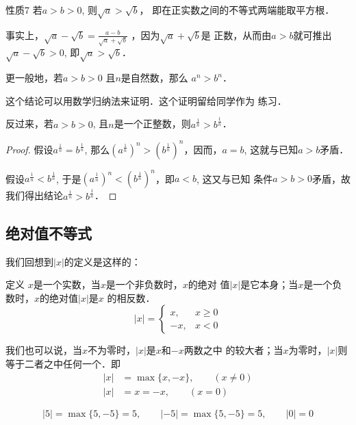 \begin{blk}{性质7}
    若$a>b>0$, 则$\sqrt{a}>\sqrt{b}$，
 即在正实数之间的不等式两端能取平方根．
\end{blk}

事实上，$\sqrt{a}-\sqrt{b}=\frac{a-b}{\sqrt{a}+\sqrt{b}}$
，因为$\sqrt{a}+\sqrt{b}$是
正数，从而由$a>b$就可推出$\sqrt{a}-\sqrt{b}>0$, 即$\sqrt{a}>\sqrt{b}$．

更一般地，若$a>b>0$ 且$n$是自然数，那么
$a^n>b^n$．

这个结论可以用数学归纳法来证明．这个证明留给同学作为
练习．

反过来，若$a>b>0$, 且$n$是一个正整数，则$a^{\tfrac{1}{n}}>b^{\tfrac{1}{n}}$．

\begin{proof}
    假设$a^{\tfrac{1}{n}}=b^{\tfrac{1}{n}}$, 那么$\left(a^{\tfrac{1}{n}}\right)^n>\left(b^{\tfrac{1}{n}}\right)^n$，因而，$a=b$, 这就与已知$a>b$矛盾．

假设$a^{\tfrac{1}{n}}<b^{\tfrac{1}{n}}$, 于是$\left(a^{\tfrac{1}{n}}\right)^n<\left(b^{\tfrac{1}{n}}\right)^n$，即$a<b$, 这又与已知
条件$a>b>0$矛盾，故我们得出结论$a^{\tfrac{1}{n}}>b^{\tfrac{1}{n}}$．
\end{proof}


\subsection{绝对值不等式}
我们回想到$|x|$的定义是这样的：

\begin{blk}{定义}
$x$是一个实数，当$x$是一个非负数时，$x$的绝对
值$|x|$是它本身；当$x$是一个负数时，$x$的绝对值$|x|$是$x$
的相反数．
\begin{equation}
|x|=\begin{cases}
    x,&x\ge 0\\
    -x,&x<0
\end{cases}
\end{equation}
\end{blk}

我们也可以说，当$x$不为零时，$|x|$是$x$和$-x$两数之中
的较大者；当$x$为零时，$|x|$则等于二者之中任何一个．即
\begin{equation}
    \begin{split}
        |x|&=\max\{x,-x\},\qquad (x\ne 0)\\
        |x|&=x=-x,\qquad (x=0)
    \end{split}
\end{equation}

\begin{example}
\[|5|=\max\{5,-5\}=5,\qquad |-5|=\max\{5,-5\}=5,\qquad |0|=0\]
\end{example}

